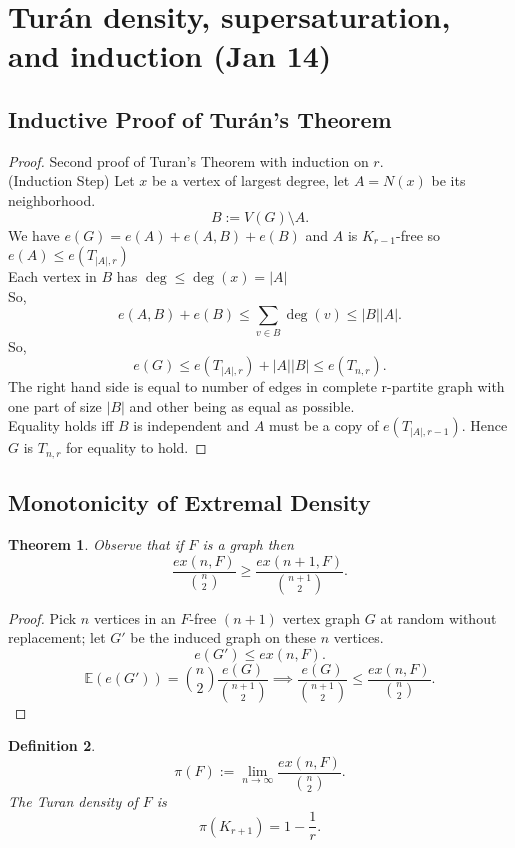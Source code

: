 \documentclass[a4paper]{article}
\newtheorem{thm}{Theorem}[section]
\newtheorem{defn}[thm]{Definition}
\begin{document}
\section{Tur\'an density, supersaturation, and induction (Jan 14)}

\subsection{Inductive Proof of Turán's Theorem}

\begin{proof}
    Second proof of Turan's Theorem with induction on $r$.\\
    (Induction Step) Let $x$ be a vertex of largest degree, let $A=N(x)$ be its neighborhood. 
    \[
    B:=V(G)\setminus A
    .\] 
    We have $e(G)=e(A)+e(A,B)+e(B)$ and $A$ is $K_{r-1}$-free so $e(A)\leq e(T_{|A|,r})$\\
    Each vertex in $B$ has $\deg\leq \deg(x)=|A|$\\
    So, \[
    e(A,B)+e(B)\leq \sum_{v\in B}\deg(v)\leq |B||A|
    .\]
    So, \[
    e(G)\leq e(T_{|A|,r})+|A||B|\leq e(T_{n,r})
    .\]
    The right hand side is equal to number of edges in complete r-partite graph with one part of size $|B|$ and other being as equal as possible. \\
    Equality holds iff $B$ is independent and $A$ must be a copy of $e(T_{|A|,r-1})$. Hence $G$ is $T_{n,r}$ for equality to hold.
\end{proof}

\subsection{Monotonicity of Extremal Density}

\begin{thm}
    Observe that if $F$ is a graph then \[
\frac{ex(n,F)}{{n \choose 2}}\geq \frac{ex(n+1,F)}{{n+1 \choose 2}}
.\]
\end{thm}
\begin{proof}
    Pick $n$ vertices in an $F$-free $(n+1)$ vertex graph $G$ at random without replacement; let $G'$ be the induced graph on these $n$ vertices. 
    \[
    e(G')\leq ex(n,F)
    .\]
    \[
    \mathbb{E}(e(G'))={n \choose 2} \frac{e(G)}{{n+1 \choose 2}}\implies \frac{e(G)}{{n+1 \choose 2}}\leq \frac{ex(n,F)}{{n \choose 2}}
    .\]
\end{proof}
\begin{defn}
    \[
    \pi(F):=\lim_{n\to \infty}\frac{ex(n,F)}{{n \choose 2}}
    .\] 
    The Turan density of $F$ is \[
    \pi(K_{r+1})=1-\frac{1}{r}
.\]
\end{defn}
\end{document}
